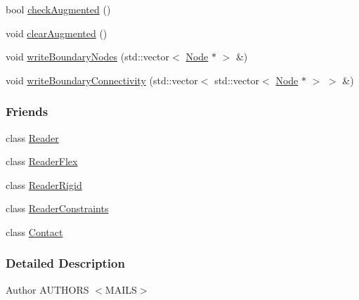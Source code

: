 \begin{DoxyCompactItemize}
\item 
bool \hyperlink{classmknix_1_1_system_a477db1887fa5858d2708f50397aa6ebf}{check\-Augmented} ()
\item 
void \hyperlink{classmknix_1_1_system_afbf67e600535664daa11f57170ce28b1}{clear\-Augmented} ()
\item 
void \hyperlink{classmknix_1_1_system_a7569699ef2cda26032879de3ea96b2e6}{write\-Boundary\-Nodes} (std\-::vector$<$ \hyperlink{classmknix_1_1_node}{Node} $\ast$ $>$ \&)
\item 
void \hyperlink{classmknix_1_1_system_a8636993e61acc2af30b0cab7e79d8c01}{write\-Boundary\-Connectivity} (std\-::vector$<$ std\-::vector$<$ \hyperlink{classmknix_1_1_node}{Node} $\ast$ $>$ $>$ \&)
\end{DoxyCompactItemize}
\subsubsection*{Friends}
\begin{DoxyCompactItemize}
\item 
class \hyperlink{classmknix_1_1_system_a35cb182752752c74a30050705acc3c06}{Reader}
\item 
class \hyperlink{classmknix_1_1_system_a1150cceac3e81192653459c61f428621}{Reader\-Flex}
\item 
class \hyperlink{classmknix_1_1_system_a6a45b3f2d8b6c9e516334b46caf0cbb7}{Reader\-Rigid}
\item 
class \hyperlink{classmknix_1_1_system_ae164a82e4890f6fbab13f95a18656edf}{Reader\-Constraints}
\item 
class \hyperlink{classmknix_1_1_system_a76d4b1c8c6040df20040808941b7e764}{Contact}
\end{DoxyCompactItemize}


\subsubsection{Detailed Description}
\begin{DoxyAuthor}{Author}
A\-U\-T\-H\-O\-R\-S $<$\-M\-A\-I\-L\-S$>$ 
\end{DoxyAuthor}


